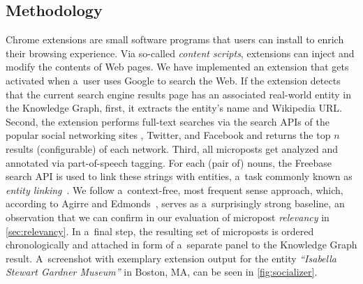 \subsection{Methodology}
Chrome extensions are small software programs that users can install
to enrich their browsing experience.
Via so-called \emph{content scripts}, extensions can inject and modify the contents of Web pages.
We have implemented an extension that gets activated when a~user uses Google to search the Web.
If the extension detects that the current search engine results page
has an associated real-world entity in the Knowledge Graph,
first, it extracts the entity's name and Wikipedia URL.
Second, the extension performs full-text searches via the search APIs of
the popular social networking sites \googleplus, Twitter, and Facebook
and returns the top $n$ results (configurable) of each network.
Third, all microposts get analyzed and annotated via part-of-speech tagging.
For each (pair of) nouns, the Freebase search API is used
to link these strings with entities,
a~task commonly known as \emph{entity linking}~\cite{spitkovsky2012}.
We follow a~context-free, most frequent sense approach,
which, according to Agirre and Edmonds~\cite{agirre2007},
serves as a~surprisingly strong baseline,
an observation that we can confirm in our evaluation of micropost \emph{relevancy}
in \autoref{sec:relevancy}.
In a~final step, the resulting set of microposts is ordered chronologically
and attached in form of a~separate panel to the Knowledge Graph result.
A~screenshot with exemplary extension output for the entity
\emph{``Isabella Stewart Gardner Museum''} in Boston, MA,
can be seen in \autoref{fig:socializer}.

